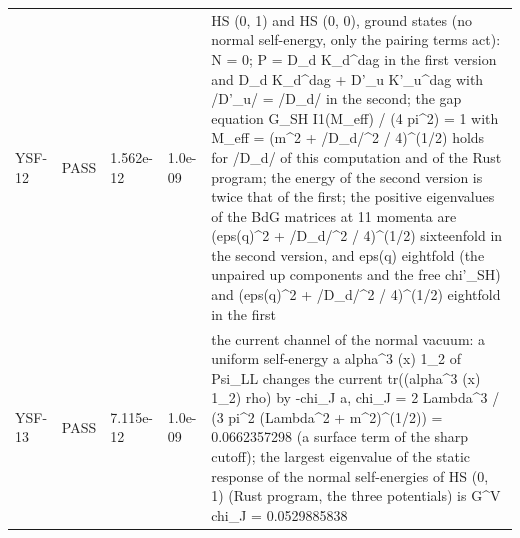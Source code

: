 \documentclass[aps,prd,onecolumn,superscriptaddress,nofootinbib,floatfix,longbibliography]{revtex4-2}
\begin{document}
\begin{longtable}{p{}p{}p{}p{}p{}}
YSF-12 & PASS & 1.562e-12 & 1.0e-09 & HS (0, 1) and HS (0, 0), ground states (no normal self-energy, only the pairing terms act): N = 0; P = D\_d K\_d\textasciicircum{}dag in the first version and D\_d K\_d\textasciicircum{}dag + D'\_u K'\_u\textasciicircum{}dag with /D'\_u/ = /D\_d/ in the second; the gap equation G\_SH I1(M\_eff) / (4 pi\textasciicircum{}2) = 1 with M\_eff = (m\textasciicircum{}2 + /D\_d/\textasciicircum{}2 / 4)\textasciicircum{}(1/2) holds for /D\_d/ of this computation and of the Rust program; the energy of the second version is twice that of the first; the positive eigenvalues of the BdG matrices at 11 momenta are (eps(q)\textasciicircum{}2 + /D\_d/\textasciicircum{}2 / 4)\textasciicircum{}(1/2) sixteenfold in the second version, and eps(q) eightfold (the unpaired up components and the free chi'\_SH) and (eps(q)\textasciicircum{}2 + /D\_d/\textasciicircum{}2 / 4)\textasciicircum{}(1/2) eightfold in the first \\
YSF-13 & PASS & 7.115e-12 & 1.0e-09 & the current channel of the normal vacuum: a uniform self-energy a alpha\textasciicircum{}3 (x) 1\_2 of Psi\_LL changes the current tr((alpha\textasciicircum{}3 (x) 1\_2) rho) by -chi\_J a, chi\_J = 2 Lambda\textasciicircum{}3 / (3 pi\textasciicircum{}2 (Lambda\textasciicircum{}2 + m\textasciicircum{}2)\textasciicircum{}(1/2)) = 0.0662357298 (a surface term of the sharp cutoff); the largest eigenvalue of the static response of the normal self-energies of HS (0, 1) (Rust program, the three potentials) is G\textasciicircum{}V chi\_J = 0.0529885838 \\
\end{longtable}
\endgroup
\end{document}
